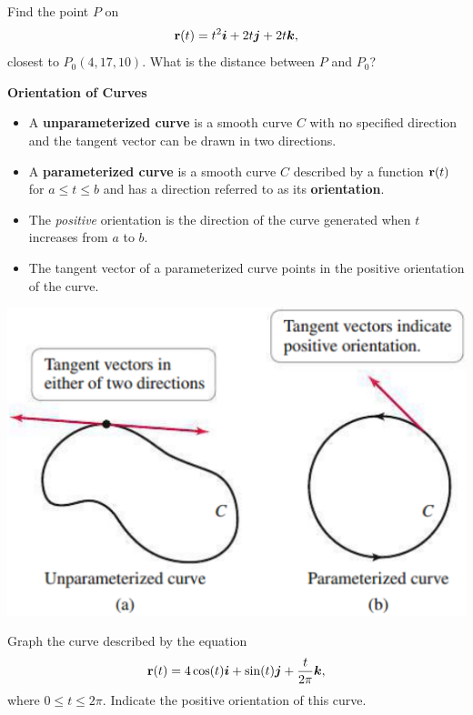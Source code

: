 \documentclass[../mathNotesPreamble]{subfiles}
\begin{document}
  \begin{ex*}
    Find the point $P$ on 
      \[{\mathbf{r}}(t)=t^2{\bm{i}}+2t{\bm{j}}+2t{\bm{k}},\]
    closest to $P_0(4,17,10)$. What is the distance between $P$ and $P_0$?
  \end{ex*}
  \pagebreak

  \textbf{Orientation of Curves}\\
  \begin{itemize}
    \item A \textbf{unparameterized curve} is a smooth curve $C$ with no specified direction and the tangent vector can be drawn in two directions.
    \item A \textbf{parameterized curve} is a smooth curve $C$ described by a function ${\mathbf{r}}(t)$ for $a\leq t\leq b$ and has a direction referred to as its \textbf{orientation}.
    \item The \textit{positive} orientation is the direction of the curve generated when $t$ increases from $a$ to $b$. 
    \item The tangent vector of a parameterized curve points in the positive orientation of the curve.
  \end{itemize}
  \begin{center}
    \includegraphics[width=0.65\linewidth]{../images/briggs_14_01/fig14_03}
  \end{center}
  \pagebreak

  \begin{ex*}
    Graph the curve described by the equation
      \[{\mathbf{r}}(t)=4\cos(t){\bm{i}}+\sin(t){\bm{j}}+\frac{t}{2\pi}{\bm{k}},\]
    where $0\leq t\leq 2\pi$. Indicate the positive orientation of this curve.
  \end{ex*}
  \pagebreak
\end{document}
